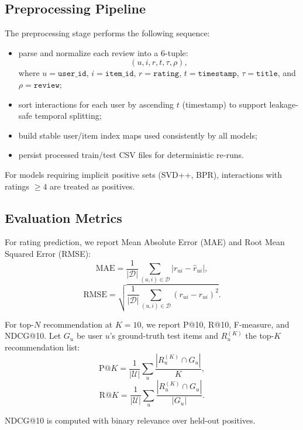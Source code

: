 \documentclass[sigconf,nonacm]{acmart}
\begin{document}
\subsection{Preprocessing Pipeline}
The preprocessing stage performs the following sequence:
\begin{itemize}
  \item parse and normalize each review into a 6-tuple:
  \[
    (u, i, r, t, \tau, \rho),
  \]
  where $u=\texttt{user\_id}$, $i=\texttt{item\_id}$, $r=\texttt{rating}$, $t=\texttt{timestamp}$, $\tau=\texttt{title}$, and $\rho=\texttt{review}$;
  \item sort interactions for each user by ascending $t$ (timestamp) to support leakage-safe temporal splitting;
  \item build stable user/item index maps used consistently by all models;
  \item persist processed train/test CSV files for deterministic re-runs.
\end{itemize}

For models requiring implicit positive sets (SVD++, BPR), interactions with ratings $\ge 4$ are treated as positives.

\subsection{Evaluation Metrics}
For rating prediction, we report Mean Absolute Error (MAE) and Root Mean Squared Error (RMSE):
\begin{equation}
\mathrm{MAE} = \frac{1}{|\mathcal{D}|}\sum_{(u,i)\in\mathcal{D}} |r_{ui}-\hat{r}_{ui}|,
\end{equation}
\begin{equation}
\mathrm{RMSE} = \sqrt{\frac{1}{|\mathcal{D}|}\sum_{(u,i)\in\mathcal{D}} (r_{ui}-\hat{r}_{ui})^2}.
\end{equation}

For top-$N$ recommendation at $K=10$, we report P@10, R@10, F-measure, and NDCG@10. Let $G_u$ be user $u$'s ground-truth test items and $R_u^{(K)}$ the top-$K$ recommendation list:
\begin{equation}
\mathrm{P@}K = \frac{1}{|\mathcal{U}|}\sum_u \frac{|R_u^{(K)} \cap G_u|}{K},
\end{equation}
\begin{equation}
\mathrm{R@}K = \frac{1}{|\mathcal{U}|}\sum_u \frac{|R_u^{(K)} \cap G_u|}{|G_u|}.
\end{equation}

NDCG@10 is computed with binary relevance over held-out positives.
\end{document}
